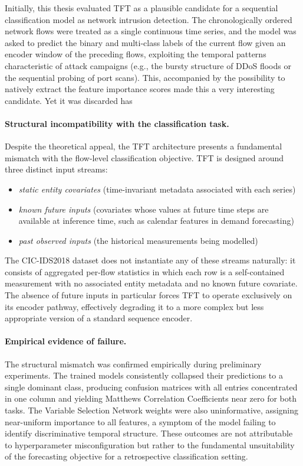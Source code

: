 \documentclass[../main.tex]{subfiles}
\begin{document}
Initially, this thesis evaluated TFT as a plausible candidate for a sequential classification model as network intrusion detection. The chronologically ordered network flows were treated as a single continuous time series, and the model was asked to predict the binary and multi-class labels of the current flow given an encoder window of the preceding flows, exploiting the temporal patterns characteristic of attack campaigns (e.g., the bursty structure of DDoS floods or the sequential probing of port scans). This, accompanied by the possibility to natively extract the feature importance scores made this a very interesting candidate. Yet it was discarded has 

\paragraph{Structural incompatibility with the classification task.}
Despite the theoretical appeal, the TFT architecture presents a fundamental mismatch with the flow-level classification objective.  TFT is designed around three distinct input streams: 
\begin{itemize}
    \item \emph{static entity covariates} (time-invariant metadata associated with each series)
    \item \emph{known future inputs} (covariates whose values at future time steps are available at inference time, such as calendar features in demand forecasting)
    \item \emph{past observed inputs} (the historical measurements being modelled)
\end{itemize}
The CIC-IDS2018 dataset does not instantiate any of these streams naturally: it consists of aggregated per-flow statistics in which each row is a self-contained measurement with no associated entity metadata and no known future covariate.  The absence of future inputs in particular forces TFT to operate exclusively on its encoder pathway, effectively degrading it to a more complex but less appropriate version of a standard sequence encoder.

\paragraph{Empirical evidence of failure.}
The structural mismatch was confirmed empirically during preliminary experiments.  The trained models consistently collapsed their predictions to a single dominant class, producing confusion matrices with all entries concentrated in one column and yielding Matthews Correlation Coefficients near zero for both tasks.  The Variable Selection Network weights were also uninformative, assigning near-uniform importance to all features, a symptom of the model failing to identify discriminative temporal structure.  These outcomes are not attributable to hyperparameter misconfiguration but rather to the fundamental unsuitability of the forecasting objective for a retrospective classification setting.
\end{document}
